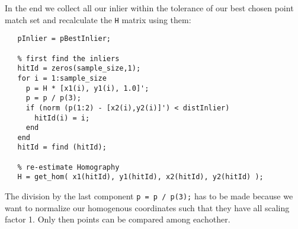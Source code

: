 \documentclass[a4paper]{scrartcl}
\newcommand{\matinl}[1]{
\lstinline[style=MyMatStyle,keywordstyle=\color{black},
stringstyle=keywordstyle=\color{black},commentstyle=\color{black},
numberstyle=\color{black}]{#1}
}
\begin{document}
\FloatBarrier
In the end we collect all our inlier within the tolerance of our best chosen 
point match set and recalculate the \matinl{H} matrix using them:
\begin{lstlisting}[style=MyMatStyle,float=!h]
% probability of picking an inlier from the parameter set
   pInlier = pBestInlier; 
     
   % first find the inliers
   hitId = zeros(sample_size,1);
   for i = 1:sample_size
     p = H * [x1(i), y1(i), 1.0]';
     p = p / p(3);
     if (norm (p(1:2) - [x2(i),y2(i)]') < distInlier)
       hitId(i) = i;
     end
   end
   hitId = find (hitId);

   % re-estimate Homography
   H = get_hom( x1(hitId), y1(hitId), x2(hitId), y2(hitId) );
\end{lstlisting}
\FloatBarrier
The division by the last component \matinl{p = p / p(3);} has to be made because
we want to normalize our homogenous coordinates such that they have all scaling 
factor 1. Only then points can be compared among eachother.

     
\end{document}
